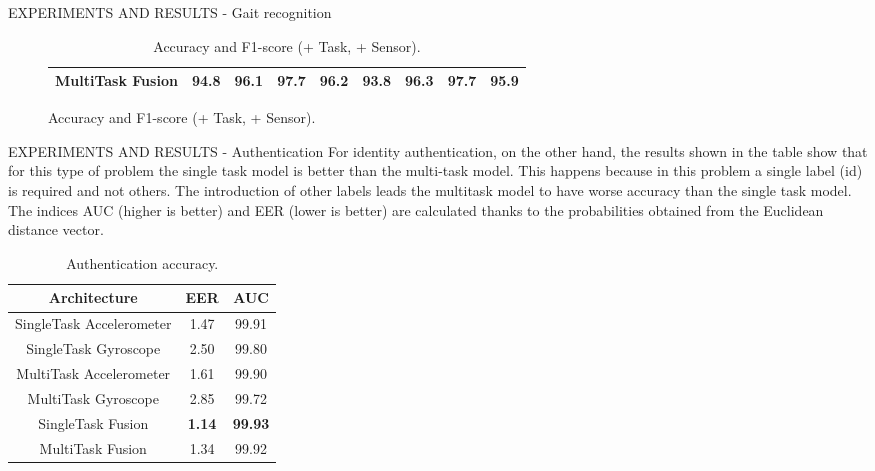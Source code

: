 \begin{frame}{EXPERIMENTS AND RESULTS - Gait recognition}
\begin{minipage}{\linewidth}
\begin{minipage}{0.45\linewidth}
\begin{figure}[htbp]
\begin{table}[h!]
\begin{adjustbox}{max width=\textwidth}
\begin{tabular}{|c||ccc|c||ccc|c|}
                            MultiTask Fusion & \bfseries{94.8} & \bfseries{96.1} & \bfseries{97.7} & \bfseries{96.2} & \bfseries{93.8} & \bfseries{96.3} & \bfseries{97.7} & \bfseries{95.9}\\
                        \hline 
                    \end{tabular}
                    \end{adjustbox}
                    \caption{Accuracy and F1-score (+ Task, + Sensor).}
                    \label{table accuracy and F1 (+ Task, + Sensor)}
                \end{table}
            \end{figure}
        \end{minipage}
    \end{minipage}
\end{frame}

\begin{frame}{EXPERIMENTS AND RESULTS - Authentication}
    For identity authentication, on the other hand, the results shown in the table show that for this type of problem the single task model is better than the multi-task model. This happens because in this problem a single label (id) is required and not others. The introduction of other labels leads the multitask model to have worse accuracy than the single task model. The indices AUC (higher is better) and EER (lower is better) are calculated thanks to the probabilities obtained from the Euclidean distance vector.
    \begin{table}[h!]
        \centering
        \begin{adjustbox}{max width=\textwidth}
        \begin{tabular}{|c|cc|}
            \hline
            Architecture & EER & AUC\\
            \hline
            SingleTask Accelerometer & 1.47 & 99.91\\
            SingleTask Gyroscope & 2.50 & 99.80\\
            \hline
            MultiTask Accelerometer & 1.61 & 99.90\\
            MultiTask Gyroscope & 2.85 & 99.72\\
            \hline
            SingleTask Fusion & \bfseries{1.14} & \bfseries{99.93}\\
            \hline
            MultiTask Fusion & 1.34 & 99.92\\
            \hline
        \end{tabular}
        \end{adjustbox}
        \caption{Authentication accuracy.}
        \label{Authentication}
    \end{table}
\end{frame}

